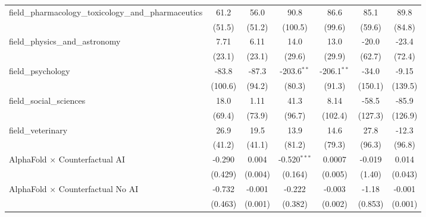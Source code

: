 \begin{tabular}{lcccccc}
   field\_pharmacology\_toxicology\_and\_pharmaceutics         & 61.2          & 56.0        & 90.8           & 86.6          & 85.1         & 89.8\\   
                                                               & (51.5)        & (51.2)      & (100.5)        & (99.6)        & (59.6)       & (84.8)\\   
   field\_physics\_and\_astronomy                              & 7.71          & 6.11        & 14.0           & 13.0          & -20.0        & -23.4\\   
                                                               & (23.1)        & (23.1)      & (29.6)         & (29.9)        & (62.7)       & (72.4)\\   
   field\_psychology                                           & -83.8         & -87.3       & -203.6$^{**}$  & -206.1$^{**}$ & -34.0        & -9.15\\   
                                                               & (100.6)       & (94.2)      & (80.3)         & (91.3)        & (150.1)      & (139.5)\\   
   field\_social\_sciences                                     & 18.0          & 1.11        & 41.3           & 8.14          & -58.5        & -85.9\\   
                                                               & (69.4)        & (73.9)      & (96.7)         & (102.4)       & (127.3)      & (126.9)\\   
   field\_veterinary                                           & 26.9          & 19.5        & 13.9           & 14.6          & 27.8         & -12.3\\   
                                                               & (41.2)        & (41.1)      & (81.2)         & (79.3)        & (96.3)       & (96.8)\\   
   AlphaFold $\times$ Counterfactual AI                        & -0.290        & 0.004       & -0.520$^{***}$ & 0.0007        & -0.019       & 0.014\\   
                                                               & (0.429)       & (0.004)     & (0.164)        & (0.005)       & (1.40)       & (0.043)\\   
   AlphaFold $\times$ Counterfactual No AI                     & -0.732        & -0.001      & -0.222         & -0.003        & -1.18        & -0.001\\   
                                                               & (0.463)       & (0.001)     & (0.382)        & (0.002)       & (0.853)      & (0.001)\\   

\end{tabular}
